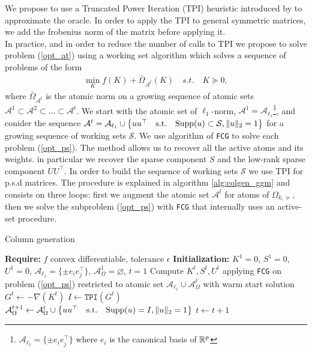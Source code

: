 We propose to use a Truncated Power Iteration (TPI) heuristic introduced by \citet{yuan2013truncated} to approximate the oracle. In order to apply the TPI to general symmetric matrices, we add the frobenius norm of the matrix before applying it. \\


In practice, and in order to reduce the number of calls to TPI we propose to solve problem (\ref{opt_at}) using a working set algorithm which solves a sequence
of problems of the form 
\begin{align}
\label{opt_ps}
\min_{K} f(K)+ \bar{\Omega}_{\mathcal{A}^{t}}(K) \quad s.t. \quad K \succeq 0,
\end{align}
where $\bar{\Omega}_{\mathcal{A}^{t}}$ is the atomic norm on a growing sequence of atomic sets $\mathcal{A}^{1}\subset \mathcal{A}^{2} \subset ... \subset \mathcal{A}^{t}$. We start with the atomic set of $\ell_1$-norm, $\mathcal{A}^{1}=\mathcal{A}_{\ell_{1}}$\footnote{$\mathcal{A}_{\ell_{1}}=\{\pm e_i e_j^{\top}\}$ where $e_i$ is the canonical basis of $\mathbb{R}^p$}, and conider the sequence $\mathcal{A}^{t}=\mathcal{A}_{\ell_{1}}\cup \big\{uu^{\top} \quad \text{s.t.} \quad {\rm Supp}(u)\subset \mathcal{S}, \|u\|_{2}=1 \big\}$ for a growing sequence of working sets $\mathcal{S}$. We use algorithm of \texttt{FCG} to solve each problem (\ref{opt_ps}). The method allows us to recover all the active atoms and its weights. in particular we recover the sparse component $S$ and the low-rank sparse component $UU^{\top}$.  In order to build the  sequence of working sets $\mathcal{S}$ we use TPI for p.s.d matrices.  The procedure is explained in algorithm \ref{alg:colgen_ggm} and consists on three loops: first we augment the atomic set $\mathcal{A}^{t}$ for atoms of  $\Omega_{k,\succeq}$, then we solve the subproblem (\ref{opt_ps}) with \texttt{FCG} that internally uses an active-set procedure.


\begin{algorithm}
\caption{Column generation}
\label{alg:colgen_ggm}
\begin{algorithmic}[1]
\State\textbf{Require: } $f$ convex differentiable, tolerance $\epsilon$ 
\State\textbf{Initialization: } $K^{1}=0$,  $S^{1}=0$, $U^{1}=0$, $\mathcal{A}_{\ell_{1}}=\{\pm e_i e_j^{\top}\}$, $\mathcal{A}^{1}_{\Omega}=\varnothing$, $t=1$
\State Compute $K^{t},S^{t},U^{t}$ applying \texttt{FCG} on problem (\ref{opt_ps}) restricted to atomic set $\mathcal{A}_{\ell_{1}} \cup \mathcal{A}_{\Omega}^{t}$ with warm start solution
\State $G^{t}\gets -\nabla(K^t)$
\State $I \gets \texttt{TPI}(G^{t})$
\State $\mathcal{A}_{\Omega}^{t+1}\gets \mathcal{A}_{\Omega}^{t}
 \cup \big\{uu^{\top} \quad \text{s.t.} \quad {\rm Supp}(u)=I, \|u\|_{2}=1 \big\} $
\EndIf
\State $t \gets t+1$
\EndWhile
\end{algorithmic}
  \end{algorithm}


